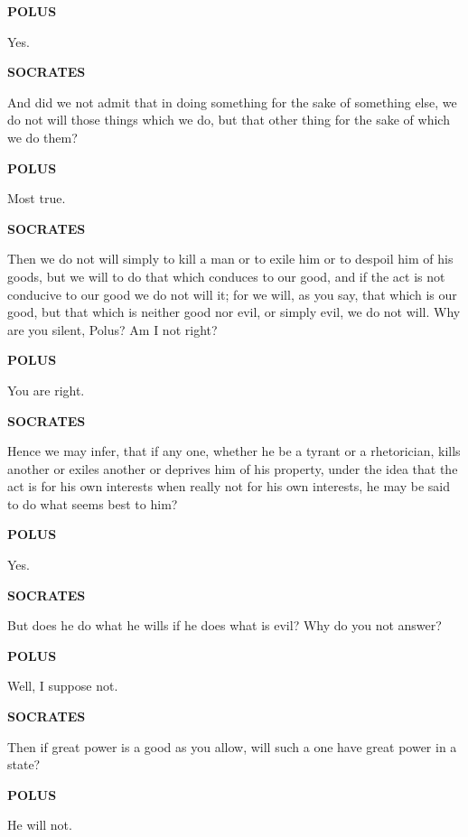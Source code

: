 \documentclass[11pt,letter]{article}
\begin{document}
\par \textbf{POLUS}
\par   Yes.

\par \textbf{SOCRATES}
\par   And did we not admit that in doing something for the sake of something else, we do not will those things which we do, but that other thing for the sake of which we do them?

\par \textbf{POLUS}
\par   Most true.

\par \textbf{SOCRATES}
\par   Then we do not will simply to kill a man or to exile him or to despoil him of his goods, but we will to do that which conduces to our good, and if the act is not conducive to our good we do not will it; for we will, as you say, that which is our good, but that which is neither good nor evil, or simply evil, we do not will. Why are you silent, Polus? Am I not right?

\par \textbf{POLUS}
\par   You are right.

\par \textbf{SOCRATES}
\par   Hence we may infer, that if any one, whether he be a tyrant or a rhetorician, kills another or exiles another or deprives him of his property, under the idea that the act is for his own interests when really not for his own interests, he may be said to do what seems best to him?

\par \textbf{POLUS}
\par   Yes.

\par \textbf{SOCRATES}
\par   But does he do what he wills if he does what is evil? Why do you not answer?

\par \textbf{POLUS}
\par   Well, I suppose not.

\par \textbf{SOCRATES}
\par   Then if great power is a good as you allow, will such a one have great power in a state?

\par \textbf{POLUS}
\par   He will not.
\end{document}
